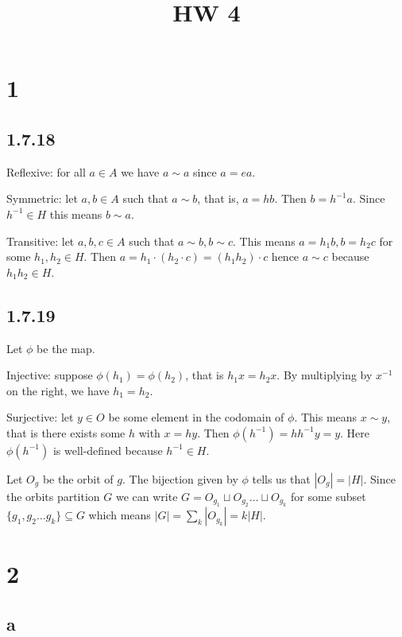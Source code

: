 \documentclass{article}
\title{HW 4}
\date{}
\def\inv{{-1}}
\begin{document}
\maketitle

\section*{1}

\subsection*{1.7.18}

Reflexive: for all $a \in A$ we have $a \sim a$ since $a = e a$.

Symmetric: let $a, b \in A$ such that $a \sim b$, that is, $a = h b$. Then $b = h^\inv a$. Since $h^\inv \in H$ this means $b \sim a$.

Transitive: let $a, b, c \in A$ such that $a \sim b, b \sim c$. This means $a = h_1 b, b = h_2 c$ for some $h_1, h_2 \in H$. Then $a = h_1 \cdot (h_2 \cdot c) = (h_1 h_2) \cdot c$ hence $a \sim c$ because $h_1 h_2 \in H$.

\subsection*{1.7.19}

Let $\phi$ be the map.

Injective: suppose $\phi(h_1) = \phi(h_2)$, that is $h_1 x = h_2 x$. By multiplying by $x^\inv$ on the right, we have $h_1 = h_2$.

Surjective: let $y \in O$ be some element in the codomain of $\phi$. This means $x \sim y$, that is there exists some $h$ with $x = hy$. Then $\phi(h^\inv) = h h^\inv y = y$. Here $\phi(h^\inv)$ is well-defined because $h^\inv \in H$.

Let $O_g$ be the orbit of $g$. The bijection given by $\phi$ tells us that $|O_g| = |H|$. Since the orbits partition $G$ we can write $G = O_{g_1} \sqcup O_{g_2} \ldots \sqcup O_{g_k}$ for some subset $\{g_1, g_2 \ldots g_k\} \subseteq G$ which means $|G| = \sum_k |O_{g_k}| = k |H|$.

\section*{2}

\subsection*{a}
\end{document}
